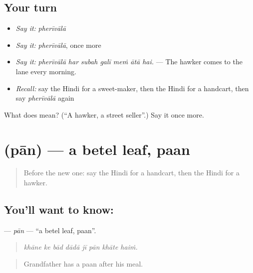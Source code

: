 \subsection*{Your turn}
\begin{itemize}
\raggedright
  \item \emph{Say it:} \emph{pherīvālā}
  \item \emph{Say it:} \emph{pherīvālā}, once more
  \item \emph{Say it:} \emph{pherīvālā har subah galī meṁ ātā hai.} — The hawker comes to the lane every morning.
  \item \emph{Recall:} say the Hindi for a sweet-maker, then the Hindi for a handcart, then say \emph{pherīvālā} again
\end{itemize}

\begin{tcolorbox}[breakable,colback=teal!4,colframe=teal!35!black,title={Before you move on}]
What does  mean? (\textquotedblleft{}A hawker, a street seller\textquotedblright{}.) Say it once more.
\end{tcolorbox}
\section[\texorpdfstring{\hi{पान} (pān)}{पान (pān)}]{ (pān) — a betel leaf, paan}

\label{lesson:HI-C424-pan}



\begin{quote}
Before the new one: say the Hindi for a handcart, then the Hindi for a hawker.
\end{quote}

\subsection*{You'll want to know: }
\textbf{} — \emph{pān} — \textquotedblleft{}a betel leaf, paan\textquotedblright{}.

\begin{quote}
       
\end{quote}

\begin{quote}
\emph{khāne ke bād dādā jī pān khāte haiṁ.}
\end{quote}

\begin{quote}
Grandfather has a paan after his meal.
\end{quote}

